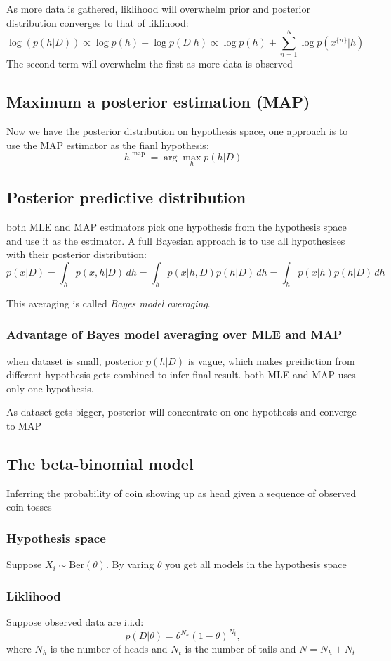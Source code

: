 \documentclass[11pt]{article}
\begin{document}
As more data is gathered, liklihood will overwhelm prior and posterior distribution converges to that of liklihood:
\[
\log(p(h|D)) \propto \log{p(h)} + \log p(D|h) \propto \log p(h) + \sum_{n=1}^N\log p(x^{\{n\}}|h)
\]
The second term will overwhelm the first as more data is observed

\subsection{Maximum a posterior estimation (MAP)}
Now we have the posterior distribution on hypothesis space, one approach is to use the MAP estimator as the fianl hypothesis:
\[
h^{\mbox{ map }} = \arg\max_h p(h|D)
\]

\subsection{Posterior predictive distribution}
both MLE and MAP estimators pick one hypothesis from the hypothesis space and use it as the estimator. A full Bayesian approach is to use all hypothesises with their posterior distribution:
\[
p(x|D) = \int_h p(x,h|D)\,dh = \int_h p(x|h,D)p(h|D)\,dh = \int_h p(x|h)p(h|D)\,dh
\]

This averaging is called \emph{Bayes model averaging}.
\subsubsection{Advantage of Bayes model averaging over MLE and MAP}
when dataset is small, posterior $p(h|D)$ is vague, which makes preidiction from different hypothesis gets combined to infer final result. both MLE and MAP uses only one hypothesis.

As dataset gets bigger, posterior will concentrate on one hypothesis and converge to MAP 

\subsection{The beta-binomial model}
Inferring the probability of coin showing up as head given a sequence of observed coin tosses 

\subsubsection{Hypothesis space}
Suppose $X_i \sim \mathrm{Ber}(\theta)$. By varing $\theta$ you get all models in the hypothesis space

\subsubsection{Liklihood}
Suppose observed data are i.i.d:
\[
p(D|\theta) = \theta^{N_h} (1-\theta)^{N_t},
\]
where $N_h$ is the number of heads and $N_t$ is the number of tails and $N=N_h+N_t$
\end{document}
